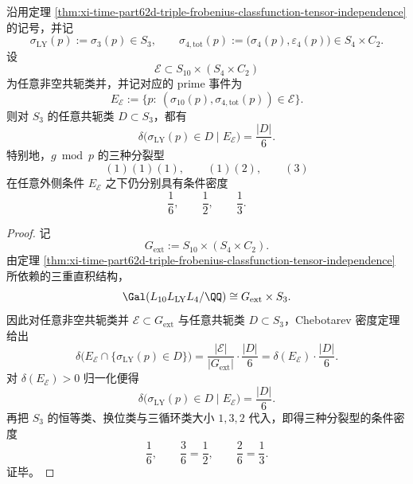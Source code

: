 \begin{proposition}\label{prop:xi-time-part62eb-leyang-external-audit-immunity}
沿用定理 \ref{thm:xi-time-part62d-triple-frobenius-classfunction-tensor-independence} 的记号，并记
\[
\sigma_{\mathrm{LY}}(p):=\sigma_3(p)\in S_3,
\qquad
\sigma_{4,\mathrm{tot}}(p):=\bigl(\sigma_4(p),\varepsilon_4(p)\bigr)\in S_4\times C_2.
\]
设
\[
\mathcal E\subset S_{10}\times (S_4\times C_2)
\]
为任意非空共轭类并，并记对应的 prime 事件为
\[
E_{\mathcal E}:=
\bigl\{
p:\ (\sigma_{10}(p),\sigma_{4,\mathrm{tot}}(p))\in \mathcal E
\bigr\}.
\]
则对 \(S_3\) 的任意共轭类 \(D\subset S_3\)，都有
\[
\delta\!\bigl(
\sigma_{\mathrm{LY}}(p)\in D\mid E_{\mathcal E}
\bigr)
=
\frac{|D|}{6}.
\]
特别地，\(g\bmod p\) 的三种分裂型
\[
(1)(1)(1),\qquad (1)(2),\qquad (3)
\]
在任意外侧条件 \(E_{\mathcal E}\) 之下仍分别具有条件密度
\[
\frac16,\qquad \frac12,\qquad \frac13.
\]
\end{proposition}
\begin{proof}
记
\[
G_{\mathrm{ext}}:=S_{10}\times (S_4\times C_2).
\]
由定理 \ref{thm:xi-time-part62d-triple-frobenius-classfunction-tensor-independence} 所依赖的三重直积结构，
\[
\Gal(L_{10}L_{\mathrm{LY}}L_4/\QQ)\cong G_{\mathrm{ext}}\times S_3.
\]
因此对任意非空共轭类并 \(\mathcal E\subset G_{\mathrm{ext}}\) 与任意共轭类 \(D\subset S_3\)，Chebotarev 密度定理给出
\[
\delta\!\bigl(E_{\mathcal E}\cap\{\sigma_{\mathrm{LY}}(p)\in D\}\bigr)
=
\frac{|\mathcal E|}{|G_{\mathrm{ext}}|}\cdot \frac{|D|}{6}
=
\delta(E_{\mathcal E})\cdot \frac{|D|}{6}.
\]
对 \(\delta(E_{\mathcal E})>0\) 归一化便得
\[
\delta\!\bigl(
\sigma_{\mathrm{LY}}(p)\in D\mid E_{\mathcal E}
\bigr)
=
\frac{|D|}{6}.
\]
再把 \(S_3\) 的恒等类、换位类与三循环类大小 \(1,3,2\) 代入，即得三种分裂型的条件密度
\[
\frac16,\qquad \frac36=\frac12,\qquad \frac26=\frac13.
\]
证毕。
\end{proof}

